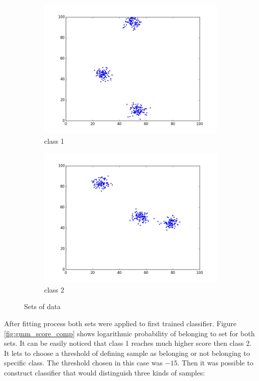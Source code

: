 \documentclass[magister]{dyplom}
\begin{document}
	\begin{figure}[!th]
		\begin{subfigure}{.5\textwidth}
			\centering
			\includegraphics[width=.8\linewidth]{images/gmm_raw_data_1}
			\caption{class 1}
		\end{subfigure}%
		\begin{subfigure}{.5\textwidth}
			\centering
			\includegraphics[width=0.8\linewidth]{images/gmm_raw_data_2}
			\caption{class 2}
		\end{subfigure}
		\caption{Sets of data}
		\label{fig:raw_sets_of_data}
	\end{figure}
	After fitting process both sets were applied to first trained classifier. Figure \ref{fig:gmm_score_comp} shows logarithmic probability of belonging to set for both sets. It can be easily noticed that class 1 reaches much higher score then class 2. It lets to choose a threshold of defining sample as belonging or not belonging to specific class. The threshold chosen in this case was $-15$. Then it was possible to construct classifier that would distinguish three kinds of samples:
	
\end{document}
